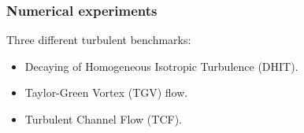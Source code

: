 \begin{frame}[t]
\frametitle{Numerical experiments}
\vfill
Three different turbulent benchmarks:
\begin{itemize}
\item Decaying of Homogeneous Isotropic Turbulence (DHIT).
\item Taylor-Green Vortex (TGV) flow.
\item Turbulent Channel Flow (TCF).
\end{itemize}
\vfill
\end{frame}